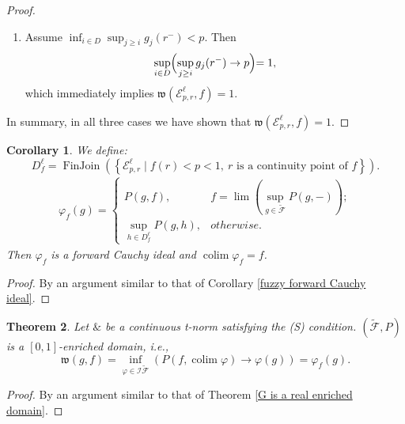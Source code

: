 \documentclass[preprint,3p,times]{elsarticle}
\theoremstyle{plain}
\newtheorem{thm}{Theorem}[section]
\newtheorem{cor}[thm]{Corollary}
\theoremstyle{definition}
\renewcommand{\phi}{\varphi}
\numberwithin{equation}{section}
\begin{document}
\begin{proof}
\begin{enumerate}[label={\rm(\arabic*)}]
    \item Assume \(\displaystyle\inf_{i \in D} \sup_{j \ge i} g_j (r^-) < p\). Then
    \[
    \sup_{i \in D} \Bigl( \sup_{j \ge i} g_j (r^-) \to p \Bigl) = 1,
    \]
    which immediately implies \(\mathfrak{w}(\mathcal{E}^\ell_{p, r}, f) = 1\).
\end{enumerate}
In summary, in all three cases we have shown that \(\mathfrak{w}(\mathcal{E}^\ell_{p, r}, f) = 1\).

\end{proof}

\begin{cor}
	We define:
    \[
   D_f^\ell=
\operatorname{FinJoin}\left(
\left\{\mathcal E^\ell_{p,r}
\mid f(r)<p<1,\ r\text{ is a continuity point of }f\right\}
\right).
    \]
	\begin{align*}
		\phi_f(g)=\begin{cases}
			P(g,f), & f= \operatorname{lim} (\sup_{g\in\tilde{\mathcal{F}}}P(g,-)); \\
			\sup_{h\in D^\ell_f} P(g,h), & otherwise.
		\end{cases} 
	\end{align*}
	Then \( \phi_f \) is a forward Cauchy ideal and \(\operatorname{colim}\phi_f=f\).
\end{cor}
\begin{proof}
By an argument similar to that of  Corollary \ref{fuzzy forward Cauchy ideal}.
\end{proof}
\begin{thm}\label{F is a real enriched domain}
	Let \( \& \) be a continuous t-norm satisfying the (S) condition. \((\tilde{\mathcal{F}},P)\) is a \([0,1]\)-enriched domain, i.e., 
	\[
	\mathfrak{w}(g, f) = \inf_{\phi \in \mathcal{I}\tilde{\mathcal{F}}} \left( P(f, \operatorname{colim} \phi) \to \phi(g) \right)=\phi_f(g).
	\]
\end{thm}
\begin{proof}
By an argument similar to that of Theorem \ref{G is a real enriched domain}.
\end{proof}
\end{document}
